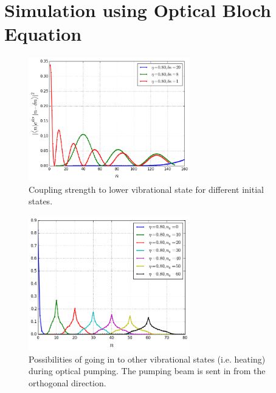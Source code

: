 \documentclass[aps,twocolumn,secnumarabic,balancelastpage,amsmath,amssymb,nofootinbib]{revtex4}
\begin{document}
\section{Simulation using Optical Bloch Equation}
\begin{figure}
  \begin{center}
    \includegraphics[width=7cm]{../raman_0.8_1.png}
  \end{center}
  \caption{Coupling strength to lower vibrational state for different initial states.}
  \label{fig-raman-curve}
\end{figure}
\begin{figure}
  \begin{center}
    \includegraphics[width=7cm]{../pump_0.8_0_curve.png}
  \end{center}
  \caption{Possibilities of going in to other vibrational states (i.e. heating) during optical pumping. The pumping beam is sent in from the orthogonal direction.}
  \label{fig-pump-curve}
\end{figure}
\end{document}

